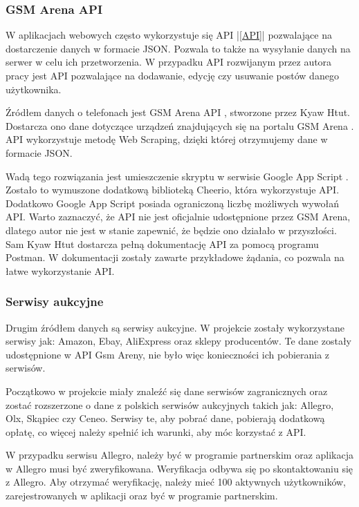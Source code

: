 \subsubsection{GSM Arena API}\label{api}
W aplikacjach webowych często wykorzystuje się API |\ref{API}| pozwalające na dostarczenie danych w formacie JSON. Pozwala to także na wysyłanie danych na serwer w celu ich przetworzenia. W przypadku API rozwijanym przez autora pracy jest API pozwalające na dodawanie, edycję czy usuwanie postów danego użytkownika.

Źródłem danych o telefonach jest GSM Arena API \cite{gsm_arena_api}, stworzone przez Kyaw Htut. Dostarcza ono dane dotyczące urządzeń znajdujących się na portalu \linebreak GSM Arena \cite{gsm_arena}. API wykorzystuje metodę Web Scraping, dzięki której otrzymujemy dane w formacie JSON.

Wadą tego rozwiązania jest umieszczenie skryptu w serwisie \linebreak Google App Script \cite{google_app_script}. Zostało to wymuszone dodatkową biblioteką Cheerio, która wykorzystuje API. Dodatkowo Google App Script posiada ograniczoną liczbę możliwych wywołań API. Warto zaznaczyć, że API nie jest oficjalnie udostępnione przez GSM Arena, dlatego autor nie jest w stanie zapewnić, że będzie ono działało w przyszłości. Sam Kyaw Htut dostarcza pełną dokumentację API za pomocą programu Postman. W dokumentacji \cite{gsm_arena_api_reference} zostały zawarte przykładowe żądania, co pozwala na łatwe wykorzystanie API.

\subsubsection{Serwisy aukcyjne}
Drugim źródłem danych są serwisy aukcyjne. W projekcie zostały wykorzystane serwisy jak: Amazon, Ebay, AliExpress oraz sklepy producentów. Te dane zostały udostępnione w API Gsm Areny, nie było więc konieczności ich pobierania z serwisów.

Początkowo w projekcie miały znaleźć się dane serwisów zagranicznych  oraz zostać rozszerzone o dane z polskich serwisów aukcyjnych takich jak: Allegro, Olx, Skąpiec czy Ceneo. Serwisy te, aby pobrać dane, pobierają dodatkową opłatę, co więcej należy spełnić ich warunki, aby móc korzystać z API.

W przypadku serwisu Allegro, należy być w programie partnerskim oraz aplikacja w Allegro musi być zweryfikowana. Weryfikacja odbywa się po skontaktowaniu się z Allegro. Aby otrzymać weryfikację, należy mieć 100 aktywnych użytkowników, zarejestrowanych w aplikacji oraz być w programie partnerskim.

